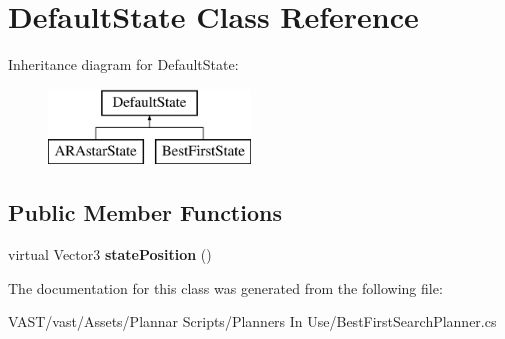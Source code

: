 \hypertarget{class_default_state}{\section{Default\-State Class Reference}
\label{class_default_state}
}
Inheritance diagram for Default\-State\-:\begin{figure}[H]
\begin{center}
\leavevmode
\includegraphics[height=2.000000cm]{class_default_state}
\end{center}
\end{figure}
\subsection*{Public Member Functions}
\begin{DoxyCompactItemize}
\item 
\hypertarget{class_default_state_a3091716e0c5026f23b55f1b377f27b6a}{virtual Vector3 {\bfseries state\-Position} ()}\label{class_default_state_a3091716e0c5026f23b55f1b377f27b6a}

\end{DoxyCompactItemize}


The documentation for this class was generated from the following file\-:\begin{DoxyCompactItemize}
\item 
V\-A\-S\-T/vast/\-Assets/\-Plannar Scripts/\-Planners In Use/Best\-First\-Search\-Planner.\-cs\end{DoxyCompactItemize}
